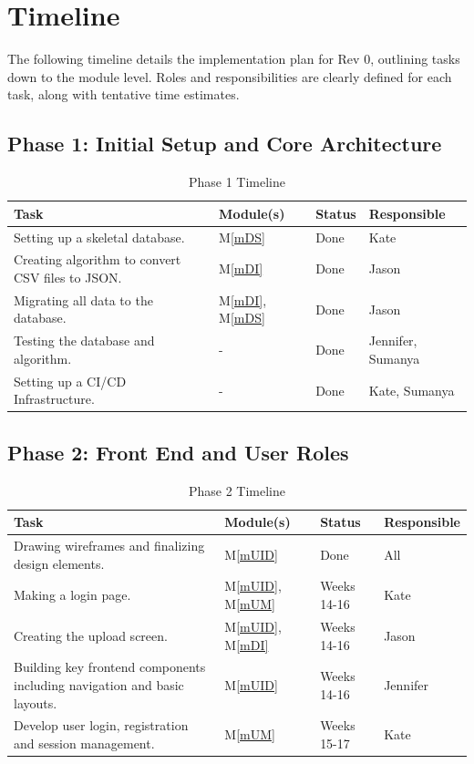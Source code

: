 \documentclass[12pt, titlepage]{article}
\newcommand{\mref}[1]{M\ref{#1}}
\begin{document}
\section{Timeline}
The following timeline details the implementation plan for Rev 0, outlining tasks down to 
the module level. Roles and responsibilities are clearly defined for each task, along with 
tentative time estimates. 
\subsection{Phase 1: Initial Setup and Core Architecture}
  \begin{table}[H]
    \centering
    \begin{tabular}{p{} p{} p{} p{}}
    \toprule
    \textbf{Task} & \textbf{Module(s)} & \textbf{Status} & \textbf{Responsible}\\
    \midrule
    Setting up a skeletal database. & \mref{mDS} & Done & Kate\\
    Creating algorithm to convert CSV files to JSON. & \mref{mDI} & Done & Jason\\
    Migrating all data to the database. & \mref{mDI}, \mref{mDS} & Done & Jason\\
    Testing the database and algorithm. & - & Done & Jennifer, Sumanya\\
    \midrule
    Setting up a CI/CD Infrastructure. & - & Done & Kate, Sumanya\\
    \bottomrule
    \end{tabular}
    \caption{Phase 1 Timeline}
    \label{TblT1}
    \end{table}

\subsection{Phase 2: Front End and User Roles}
  \begin{table}[H]
      \centering
      \begin{tabular}{p{} p{} p{} p{}}
      \toprule
      \textbf{Task} & \textbf{Module(s)} & \textbf{Status} & \textbf{Responsible}\\
      \midrule
      Drawing wireframes and finalizing design elements. & \mref{mUID} & Done & All\\
      \midrule
      Making a login page. & \mref{mUID}, \mref{mUM} & Weeks 14-16  & Kate\\
      Creating the upload screen. & \mref{mUID}, \mref{mDI} & Weeks 14-16 & Jason\\
      Building key frontend components including navigation and basic layouts. & \mref{mUID} &
      Weeks 14-16 & Jennifer\\
      \midrule
      Develop user login, registration and session management. & \mref{mUM} & Weeks 15-17 & Kate\\
      \bottomrule
      \end{tabular}
      \caption{Phase 2 Timeline}
      \label{TblT2}
    \end{table}
\end{document}

